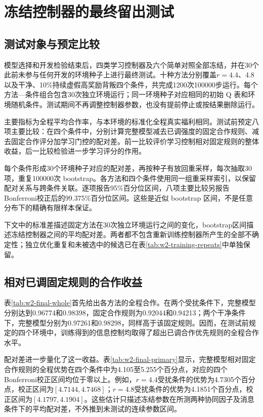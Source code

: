 \section{冻结控制器的最终留出测试}
\label{sec:w2-final-test}
\subsection{测试对象与预定比较}

模型选择和开发检验结束后，四类学习控制器及六个简单对照全部冻结，并在30个此前未参与任何开发的环境种子上进行最终测试。十种方法分别覆盖$r=4.4$、4.8以及干净、10\%持续虚假高奖励背叛四个条件，共完成1200次100000步运行。每个方法—条件组合包含30次独立环境运行；同一环境种子对应相同的初始 Q 表和环境随机条件。测试期间不再调整控制器参数，也没有提前停止或按结果删除运行。

主要指标为全程平均合作率，与本环境的标准化全程真实福利相同。测试前预定八项主要比较：在四个条件中，分别计算完整模型减去已调强度的固定合作规则、减去固定合作评分加学习门控的配对差。前一比较评价学习控制相对固定规则的整体收益，后一比较检验进一步学习评分的作用。

每个条件形成30个环境种子对应的配对差，再按种子有放回重采样，每次抽取30项，重复100000次 bootstrap。各方法和四个条件使用同一组重采样索引，以保留配对关系与跨条件关联。逐项报告95\%百分位区间，八项主要比较另报告Bonferroni校正后的99.375\%百分位区间。这些是近似 bootstrap 区间，不是任意分布下的精确有限样本保证。

下文中的标准差描述固定方法在30次独立环境运行之间的变化，bootstrap区间描述冻结控制器之间的平均配对差。两者都不包含重新训练控制器所产生的全部不确定性；独立优化重复和未被选中的候选已在表\ref{tab:w2-training-repeats}中单独保留。

\subsection{相对已调固定规则的合作收益}

表\ref{tab:w2-final-whole}首先给出各方法的全程合作。在两个受扰条件下，完整模型分别达到0.96774和0.98398，固定合作规则为0.92044和0.94213；两个干净条件下，完整模型分别为0.97261和0.98298，同样高于该固定规则。因而，在测试前规定的四个环境中，训练得到的信息控制均取得了超出已调合作优先规则的全程合作水平。



配对差进一步量化了这一收益。表\ref{tab:w2-final-primary}显示，完整模型相对固定合作规则的全程优势在四个条件中为4.105至5.255个百分点，对应的四个Bonferroni校正区间均位于零以上。例如，$r=4.4$受扰条件的优势为4.7305个百分点，校正区间为$[4.7144,4.7468]$；$r=4.8$受扰条件的优势为4.1851个百分点，校正区间为$[4.1797,4.1904]$。这些估计只描述冻结参数在所测两种协同因子及消息条件下的平均配对差，不外推到未测试的连续参数区间。

